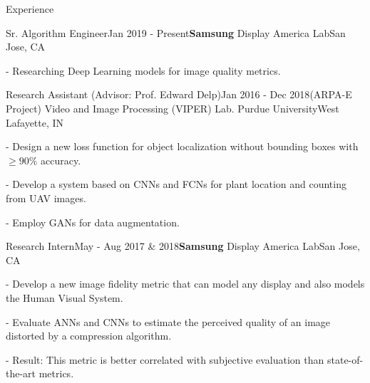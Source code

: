 \documentclass{resume} %
\begin{document}
% 


\begin{rSection}{Experience}

\begin{rSubsection}{Sr. Algorithm Engineer}{Jan 2019 - Present}{\textbf{Samsung} Display America Lab}{San Jose, CA}
\setlength{\itemindent}{.3in}
\item[-] Researching Deep Learning models for image quality metrics.
\end{rSubsection}


\begin{rSubsection}{Research Assistant ({\normalfont Advisor}: Prof. Edward Delp)}{Jan 2016 - Dec 2018}{(ARPA-E Project) Video and Image Processing (VIPER) Lab. Purdue University}{West Lafayette, IN}
\setlength{\itemindent}{.3in}
\item[-] Design a new loss function for object localization without bounding boxes with $ \ge 90\%$ accuracy.
\item[-] Develop a system based on CNNs and FCNs for plant location and counting from UAV images.
\item[-] Employ GANs for data augmentation.
\end{rSubsection}


\begin{rSubsection}{Research Intern}{May - Aug 2017 \& 2018}{\textbf{Samsung} Display America Lab}{San Jose, CA}
\setlength{\itemindent}{.3in}
\item[-] Develop a new image fidelity metric that can model any display and also models the Human Visual System.
\item[-] Evaluate ANNs and CNNs to estimate the perceived quality of an image distorted by a compression algorithm.
\item[-] Result: This metric is better correlated with subjective evaluation than state-of-the-art metrics.
\end{rSubsection}


\end{rSection}
\end{document}
